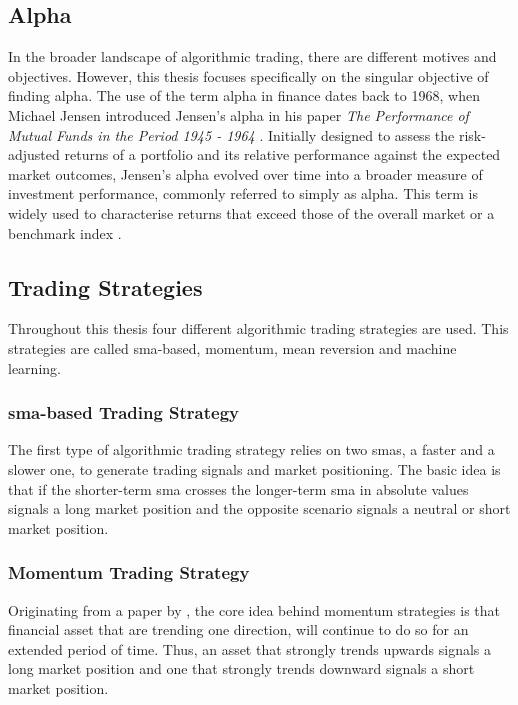 \subsection{Alpha}
\label{sub:Alpha}
In the broader landscape of algorithmic trading, there are different motives and objectives. However, this thesis focuses specifically on the singular objective of finding alpha. The use of the term alpha in finance dates back to 1968, when Michael Jensen introduced Jensen's alpha in his paper \textit{The Performance of Mutual Funds in the Period 1945 - 1964} \citep{jensen1968performance}. Initially designed to assess the risk-adjusted returns of a portfolio and its relative performance against the expected market outcomes, Jensen's alpha evolved over time into a broader measure of investment performance, commonly referred to simply as alpha. This term is widely used to characterise returns that exceed those of the overall market or a benchmark index \citep{tulchinsky2019finding}.

\subsection{Trading Strategies}
\label{sub:Trading_Strategies}
Throughout this thesis four different algorithmic trading strategies are used. This strategies are called \gls{sma}-based, momentum, mean reversion and machine learning.

\subsubsection{\gls{sma}-based Trading Strategy}
\label{subsub:SMA}
The first type of algorithmic trading strategy relies on two \glspl{sma}, a faster and a slower one, to generate trading signals and market positioning. The basic idea is that if the shorter-term \gls{sma} crosses the longer-term \gls{sma} in absolute values signals a long market position and the opposite scenario signals a neutral or short market position.

\subsubsection{Momentum Trading Strategy}
\label{subsub:Momentum}
Originating from a paper by \cite{jegadeesh1993returns}, the core idea behind momentum strategies is that financial asset that are trending one direction, will continue to do so for an extended period of time. Thus, an asset that strongly trends upwards signals a long market position and one that strongly trends downward signals a short market position.

